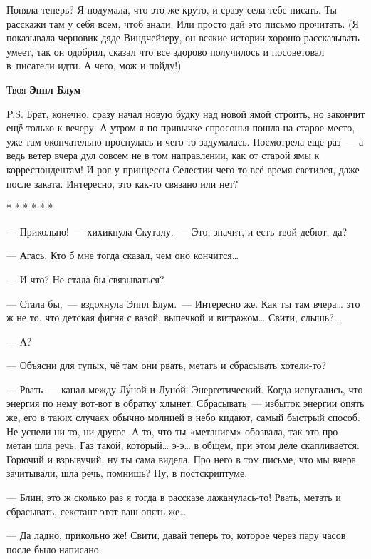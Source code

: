 \documentclass[fontsize=11pt,a5paper,titlepage=firstcover]{scrbook}
\begin{document}
Поняла теперь? Я подумала, что это же круто, и сразу села тебе писать. Ты расскажи там у себя всем, чтоб знали. Или просто дай это письмо прочитать. (Я показывала черновик дяде Виндчейзеру, он всякие истории хорошо рассказывать умеет, так он одобрил, сказал что всё здорово получилось и посоветовал в~писатели идти. А чего, мож и пойду!)
\begin{flushright}Твоя \textbf{Эппл Блум}\end{flushright} 
P.S. Брат, конечно, сразу начал новую будку над новой ямой строить, но закончит ещё только к вечеру. А утром я по привычке спросонья пошла на старое место, уже там окончательно проснулась и чего-то задумалась. Посмотрела ещё раз~--- а ведь ветер вчера дул совсем не в том направлении, как от старой ямы к корреспондентам! И рог у принцессы Селестии чего-то всё время светился, даже после заката. Интересно, это как-то связано или нет?
\begin{center}
	* * * * * *
\end{center}

--- Прикольно!~--- хихикнула Скуталу.~--- Это, значит, и есть твой дебют, да?

--- Агась. Кто б мне тогда сказал, чем оно кончится{\ldots}

--- И что? Не стала бы связываться?

--- Стала бы,~--- вздохнула Эппл Блум.~--- Интересно же. Как ты там вчера{\ldots} это ж не то, что детская фигня с вазой, выпечкой и витражом{\ldots} Свити, слышь?..

--- А?

--- Объясни для тупых, чё там они рвать, метать и сбрасывать хотели-то?

--- Рвать~--- канал между Лу́ной и Луно́й. Энергетический. Когда испугались, что энергия по нему вот-вот в обратку хлынет. Сбрасывать~--- избыток энергии опять же, его в таких случаях обычно молнией в небо кидают, самый быстрый способ. Не успели ни то, ни другое. А то, что ты «метанием» обозвала, так это про метан шла речь. Газ такой, который{\ldots} э-э{\ldots} в общем, при этом деле скапливается. Горючий и взрывучий, ну ты сама видела. Про него в том письме, что мы вчера зачитывали, шла речь, помнишь? Ну, в постскриптуме.

--- Блин, это ж сколько раз я тогда в рассказе лажанулась-то! Рвать, метать и сбрасывать, секстант этот ваш опять же{\ldots}

--- Да ладно, прикольно же! Свити, давай теперь то, которое через пару часов после было написано.
\end{document}
